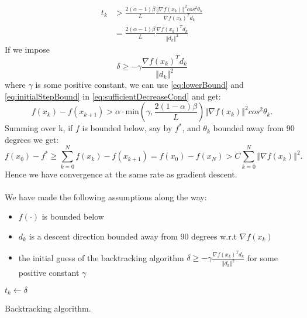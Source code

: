 \documentclass{article}
\newcommand{\norm}[1]{\left\Vert #1 \right\Vert}
\begin{document}
\begin{align}
	t_k &> \frac{2(\alpha-1)\beta}{L} \frac{\norm{\nabla f(x_k)}^2 cos^2\theta_k}{\nabla f(x_k)^Td_k} 	\label{eq:lowerBound}\\
	&=\frac{2(\alpha-1)\beta}{L}\frac{\nabla f(x_k)^Td_k}{\norm{d_k}^2}
\end{align}
If we impose
\begin{equation}
\delta\geq-\gamma\frac{\nabla f(x_k)^Td_k}{\norm{d_k}^2}
\label{eq:initialStepBound}
\end{equation}
where $\gamma$ is some positive constant, we can use \ref{eq:lowerBound} and \ref{eq:initialStepBound} in \ref{eq:sufficientDecreaseCond} and get:
\begin{equation}
f(x_k) - f(x_{k+1}) >\alpha\cdot \text{min}\left(\gamma,\frac{2(1-\alpha)\beta}{L}\right ) \norm{\nabla f(x_k)}^2 cos^2\theta_k.
\end{equation}
Summing over k, if $f$ is bounded below, say by $f^*$, and $\theta_k$ bounded away from 90 degrees we get:
\begin{equation}
	f(x_0)-f^* \geq \sum_{k=0}^N f(x_k) - f(x_{k+1})  = f(x_0)-f(x_N) > C\sum_{k=0}^N\norm{\nabla f(x_k)}^2.
	\label{eq:gradientNormInequality}
\end{equation}
Hence we have convergence at the same rate as gradient descent.\\\\
We have made the following assumptions along the way:
\begin{itemize}
	\item $f(\cdot)$ is bounded below
	\item $d_k$ is a descent direction bounded away from 90 degrees w.r.t $\nabla f(x_k)$
	\item the initial guess of the backtracking algorithm $\delta\geq- \gamma \frac{\nabla f(x_k)^Td_k}{\norm{d_k}^2}$ for some positive constant $\gamma$
\end{itemize}


\begin{algorithm}[!h]
	$t_k\gets \delta$\\
	\caption{Backtracking algorithm.}
	\label{algo:backtracking}
\end{algorithm}
\end{document}
